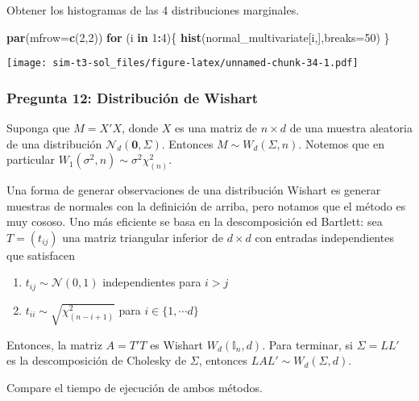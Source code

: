 \documentclass[]{article}
\newenvironment{Shaded}{\begin{snugshade}}{\end{snugshade}}
\newcommand{\ControlFlowTok}[1]{\textcolor[rgb]{0.13,0.29,0.53}{\textbf{#1}}}
\newcommand{\DataTypeTok}[1]{\textcolor[rgb]{0.13,0.29,0.53}{#1}}
\newcommand{\DecValTok}[1]{\textcolor[rgb]{0.00,0.00,0.81}{#1}}
\newcommand{\KeywordTok}[1]{\textcolor[rgb]{0.13,0.29,0.53}{\textbf{#1}}}
\newcommand{\NormalTok}[1]{#1}
\newcommand{\OperatorTok}[1]{\textcolor[rgb]{0.81,0.36,0.00}{\textbf{#1}}}
\providecommand{\tightlist}{%
  \setlength{\itemsep}{0pt}\setlength{\parskip}{0pt}}
\begin{document}
Obtener los histogramas de las 4 distribuciones marginales.

\begin{Shaded}
\begin{Highlighting}[]
\KeywordTok{par}\NormalTok{(}\DataTypeTok{mfrow=}\KeywordTok{c}\NormalTok{(}\DecValTok{2}\NormalTok{,}\DecValTok{2}\NormalTok{))}
\ControlFlowTok{for}\NormalTok{ (i }\ControlFlowTok{in} \DecValTok{1}\OperatorTok{:}\DecValTok{4}\NormalTok{)\{}
  \KeywordTok{hist}\NormalTok{(normal_multivariate[i,],}\DataTypeTok{breaks=}\DecValTok{50}\NormalTok{)}
\NormalTok{\}}
\end{Highlighting}
\end{Shaded}

\texttt{[image: sim-t3-sol\_files/figure-latex/unnamed-chunk-34-1.pdf]}

\hypertarget{pregunta-12-distribucion-de-wishart}{%
\subsubsection{Pregunta 12: Distribución de
Wishart}\label{pregunta-12-distribucion-de-wishart}}

Suponga que \(M=X'X\), donde \(X\) es una matriz de \(n \times d\) de
una muestra aleatoria de una distribución
\(\mathcal{N}_d(\mathbf{0}, \Sigma)\). Entonces
\(M \sim W_d(\Sigma, n)\). Notemos que en particular
\(W_1(\sigma ^2, n) \sim \sigma ^2 \chi^2_{(n)}\).

Una forma de generar observaciones de una distribución Wishart es
generar muestras de normales con la definición de arriba, pero notamos
que el método es muy cososo. Uno más eficiente se basa en la
descomposición ed Bartlett: sea \(T=(t_{ij})\) una matriz triangular
inferior de \(d \times d\) con entradas independientes que satisfacen

\begin{enumerate}
\def\labelenumi{\alph{enumi})}
\tightlist
\item
  \(t_{ij} \sim \mathcal{N}(0,1)\) independientes para \(i>j\)
\item
  \(t_{ii} \sim \sqrt{\chi^2_{(n-i+1)}}\) para \(i\in \{1, \cdots d\}\)
\end{enumerate}

Entonces, la matriz \(A=T'T\) es Wishart \(W_d(\mathbb{I}_n, d)\). Para
terminar, si \(\Sigma = LL'\) es la descomposición de Cholesky de
\(\Sigma\), entonces \(LAL' \sim W_d(\Sigma, d)\).

Compare el tiempo de ejecución de ambos métodos.
\end{document}
